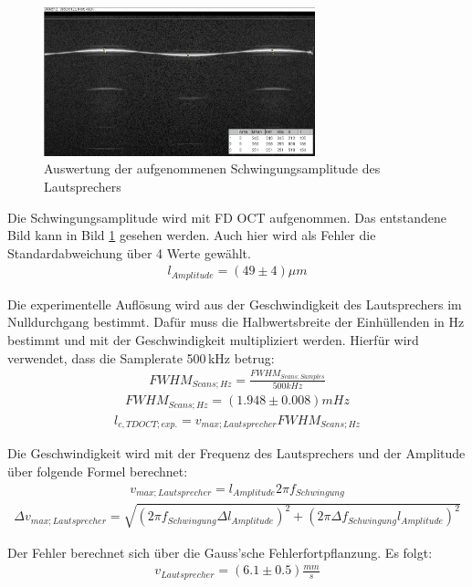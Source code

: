 \documentclass[german, %
parskip=full, %
bibliography=totoc, %
]{scrartcl}
\begin{document}
\begin{figure}[ht] 
  \centering
    \includegraphics[width=0.7\textwidth]{Amplitude_Beispiel}
  \caption{Auswertung der aufgenommenen Schwingungsamplitude des Lautsprechers}
  \label{fig:amplitude}
\end{figure}

Die Schwingungsamplitude wird mit FD OCT aufgenommen. Das entstandene Bild kann in Bild \ref{fig:amplitude} gesehen werden. Auch hier wird als Fehler die Standardabweichung über 4 Werte gewählt.
\begin{align*}
l_{Amplitude} = (49 \pm 4) \mu m
\end{align*}

Die experimentelle Auflösung wird aus der Geschwindigkeit des Lautsprechers im Nulldurchgang bestimmt. Dafür muss die Halbwertsbreite der Einhüllenden in Hz bestimmt und mit der Geschwindigkeit multipliziert werden. Hierfür wird verwendet, dass die Samplerate 500\,kHz betrug:
\begin{align}
FWHM_{Scans;Hz} = \frac{FWHM_{Scans;Samples}}{500 kHz}
\end{align}
\begin{align*}
FWHM_{Scans;Hz} = (1.948 \pm 0.008) mHz
\end{align*}
\begin{align}
l_{c, TD OCT; exp.} = v_{max; Lautsprecher} FWHM_{Scans;Hz}
\end{align}

Die Geschwindigkeit wird mit der Frequenz des Lautsprechers und der Amplitude über folgende Formel berechnet:
\begin{align}
v_{max; Lautsprecher} = l_{Amplitude} 2 \pi f_{Schwingung} 
\end{align}
\begin{align}
\Delta v_{max; Lautsprecher} = \sqrt{(2 \pi f_{Schwingung} \Delta l_{Amplitude})^2 + (2 \pi \Delta f_{Schwingung} l_{Amplitude})^2}
\end{align}

Der Fehler berechnet sich über die Gauss'sche Fehlerfortpflanzung. Es folgt:
\begin{align*}
v_{Lautsprecher} = (6.1 \pm 0.5) \frac{mm}{s}
\end{align*}
 
\end{document}

